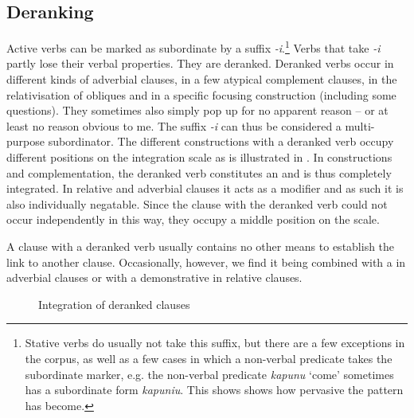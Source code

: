 \subsection{Deranking}\label{sec:Subordination-i}

Active verbs can be marked as subordinate by a suffix \textit{-i}.\footnote{Stative verbs do usually not take this suffix, but there are a few exceptions in the corpus, as well as a few cases in which a non-verbal predicate takes the subordinate marker, e.g. the non-verbal predicate \textit{kapunu} ‘come’ sometimes has a subordinate form \textit{kapuniu}. This shows shows how pervasive the pattern has become.} Verbs that take \textit{-i} partly lose their verbal properties. They are deranked. Deranked verbs occur in different kinds of adverbial clauses, in a few atypical complement clauses, in the relativisation of obliques and in a specific focusing construction (including some questions). They sometimes also simply pop up for no apparent reason -- or at least no reason obvious to me. The suffix \textit{-i} can thus be considered a multi-purpose subordinator. The different constructions with a deranked verb occupy different positions on the integration scale as is illustrated in . In  constructions and complementation, the deranked verb constitutes an  and is thus completely integrated. In relative and adverbial clauses it acts as a modifier and as such it is also individually negatable. Since the clause with the deranked verb could not occur independently in this way, they occupy a middle position on the scale.

A clause with a deranked verb usually contains no other means to establish the link to another clause. Occasionally, however, we find it being combined with a  in adverbial clauses or with a demonstrative in relative clauses. 

\begin{figure}
\centering
{}
\caption{Integration of deranked clauses}
\label{fig:IntegrationScaleDeranking}
\end{figure}

